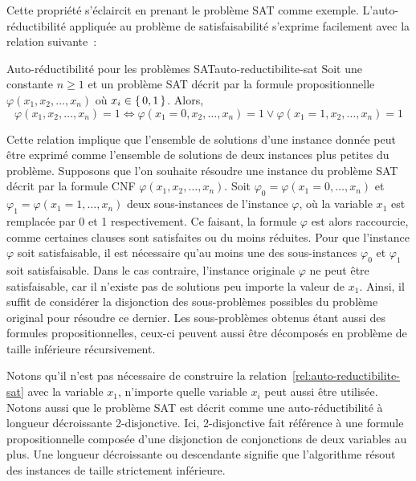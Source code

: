 Cette propriété s'éclaircit en prenant le problème SAT comme exemple. L'auto-réductibilité appliquée au problème de satisfaisabilité s'exprime facilement avec la relation suivante~\cite{hemaspaandraPowerSelfReducibilitySelectivity2020}:

\begin{relation}{Auto-réductibilité pour les problèmes SAT}{auto-reductibilite-sat}
    Soit une constante $n \geq 1$ et un problème SAT décrit par la formule propositionnelle $\varphi(x_{1}, x_{2}, \dots, x_{n})$ où $x_{i} \in \set{ 0, 1 }$. Alors,
    \begin{equation*}
        \varphi(x_{1}, x_{2}, \dots, x_{n}) = 1 \iff \varphi(x_{1}=0, x_{2}, \dots, x_{n}) = 1 \lor \varphi(x_{1}=1, x_{2}, \dots, x_{n}) = 1
    \end{equation*}
\end{relation}

Cette relation implique que l'ensemble de solutions d'une instance donnée peut être exprimé comme l'ensemble de solutions de deux instances plus petites du problème. Supposons que l'on souhaite résoudre une instance du problème SAT décrit par la formule CNF $\varphi(x_{1}, x_{2}, \dots, x_{n})$. Soit $\varphi_{0} = \varphi(x_{1}=0, \dots, x_{n})$ et $\varphi_{1} = \varphi(x_{1}=1, \dots, x_{n})$ deux sous-instances de l'instance $\varphi$, où la variable $x_{1}$ est remplacée par 0 et 1 respectivement. Ce faisant, la formule $\varphi$ est alors raccourcie, comme certaines clauses sont satisfaites ou du moins réduites. Pour que l'instance $\varphi$ soit satisfaisable, il est nécessaire qu'au moins une des sous-instances $\varphi_{0}$ et $\varphi_{1}$ soit satisfaisable. Dans le cas contraire, l'instance originale $\varphi$ ne peut être satisfaisable, car il n'existe pas de solutions peu importe la valeur de $x_{1}$. Ainsi, il suffit de considérer la disjonction des sous-problèmes possibles du problème original pour résoudre ce dernier. Les sous-problèmes obtenus étant aussi des formules propositionnelles, ceux-ci peuvent aussi être décomposés en problème de taille inférieure récursivement. 

Notons qu'il n'est pas nécessaire de construire la relation~\ref{rel:auto-reductibilite-sat} avec la variable $x_{1}$, n'importe quelle variable $x_{i}$ peut aussi être utilisée. Notons aussi que le problème SAT est décrit comme une auto-réductibilité à longueur décroissante 2-disjonctive. Ici, 2-disjonctive fait référence à une formule propositionnelle composée d'une disjonction de conjonctions de deux variables au plus. Une longueur décroissante ou descendante signifie que l'algorithme résout des instances de taille strictement inférieure.

